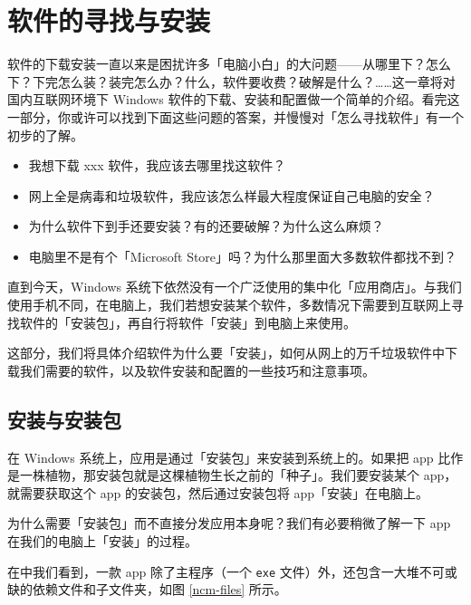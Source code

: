 \chapter{软件的寻找与安装}
\label{software-installation}

\begin{intro}
  软件的下载安装一直以来是困扰许多「电脑小白」的大问题——从哪里下？怎么下？下完怎么装？装完怎么办？什么，软件要收费？破解是什么？……这一章将对国内互联网环境下 Windows 软件的下载、安装和配置做一个简单的介绍。看完这一部分，你或许可以找到下面这些问题的答案，并慢慢对「怎么寻找软件」有一个初步的了解。
  \begin{itemize}
    \item 我想下载 xxx 软件，我应该去哪里找这软件？
    \item 网上全是病毒和垃圾软件，我应该怎么样最大程度保证自己电脑的安全？
    \item 为什么软件下到手还要安装？有的还要破解？为什么这么麻烦？
    \item 电脑里不是有个「Microsoft Store」吗？为什么那里面大多数软件都找不到？
  \end{itemize}
\end{intro}

直到今天，Windows 系统下依然没有一个广泛使用的集中化「应用商店」。与我们使用手机不同，在电脑上，我们若想安装某个软件，多数情况下需要到互联网上寻找软件的「安装包」，再自行将软件「安装」到电脑上来使用。

这部分，我们将具体介绍软件为什么要「安装」，如何从网上的万千垃圾软件中下载我们需要的软件，以及软件安装和配置的一些技巧和注意事项。

\section{安装与安装包}

在 Windows 系统上，应用是通过「安装包」来安装到系统上的。如果把 app 比作是一株植物，那安装包就是这棵植物生长之前的「种子」。我们要安装某个 app，就需要获取这个 app 的安装包，然后通过安装包将 app「安装」在电脑上。

为什么需要「安装包」而不直接分发应用本身呢？我们有必要稍微了解一下 app 在我们的电脑上「安装」的过程。

在中我们看到，一款 app 除了主程序（一个 \verb|exe| 文件）外，还包含一大堆不可或缺的依赖文件和子文件夹，如图 \ref{ncm-files} 所示。

